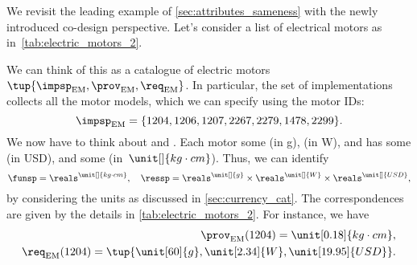 \begin{example}
    \label{exa:dpi_elmotor}
    We revisit the leading example of \cref{sec:attributes_sameness} with the newly introduced co-design perspective.
    Let's consider a list of electrical motors as in~\cref{tab:electric_motors_2}.
    \begin{table*}[h]
        \centering
        \caption{A simplified catalogue of motors.}
        \label{tab:electric_motors_2}
    \end{table*}
    
    We can think of this as a catalogue of electric motors~$\tup{\impsp_\mathrm{EM},\prov_\mathrm{EM},\req_\mathrm{EM}}$.
    In particular, the set of implementations collects all the motor models, which we can specify using the motor IDs:
    \begin{equation}
        \impsp_\mathrm{EM}=\{1204,1206,1207,2267,2279,1478,2299 \}.
    \end{equation}
    We now have to think about  and .
    Each motor  some  (in \unit[]{g}),  (in \unit[]{W}), and has some  (in USD), and  some  (in~$\unit[]{kg\cdot cm}$).
    Thus, we can identify
    \begin{equation*}
        \funsp =\reals^{\unit[]{kg\cdot cm}},\quad \ressp=\reals^{\unit[]{g}}\times \reals^{\unit[]{W}}\times \reals^{\unit[]{USD}},
    \end{equation*}
    by considering the units as discussed in \cref{sec:currency_cat}.
    The correspondences are given by the details in \cref{tab:electric_motors_2}.
    For instance, we have
    \begin{align}
        \prov_\mathrm{EM}(1204)=\unit[0.18]{kg\cdot cm}, \\ \req_\mathrm{EM}(1204)=\tup{\unit[60]{g},\unit[2.34]{W},\unit[19.95]{USD}}.
    \end{align}
    

\end{example}
